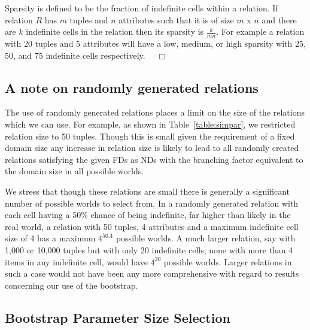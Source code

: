 \begin{definition}[Sparsity]\label{def:spar}
\begin{rm}
Sparsity is defined to be the fraction of indefinite cells within a 
relation. If relation $R$ has $m$ tuples and $n$ attributes such that it
is of size $m$ x $n$ and there are $k$ indefinite cells in the relation then
its sparsity is $\frac{k}{mn}$. For example a relation with 20 tuples
and 5 attributes will have a low, medium, or high sparsity with 
25, 50, and 75 indefinite cells respectively. $\quad\Box$
\end{rm}
\end{definition}

 

\subsection{A note on randomly generated relations}

The use of randomly generated relations places a limit on the size of
the relations which we can use. For example, as shown in
Table~\ref{table:simpar}, we restricted relation size to 50
tuples. Though this is small given the requirement of a fixed domain
size any increase in relation size is likely to lead to all randomly
created relations satisfying the given FDs as NDs with the branching
factor equivalent to the domain size in all possible worlds. 

\medskip

We stress that though these relations are small there is generally a
significant number of possible worlds to select from.  In a randomly
generated relation with each cell having a 50\% chance of being
indefinite, far higher than likely in the real world, a relation with
50 tuples, 4 attributes and a maximum indefinite cell size of 4 has a
maximum $4^{50.4}$ possible worlds.  A much larger relation, say with
1,000 or 10,000 tuples but with only 20 indefinite cells, none with more
than 4 items in any indefinite cell, would have $4^{20}$ possible
worlds. Larger relations in such a case would not have been any more
comprehensive with regard to results concerning our use of the
bootstrap. 

\subsection{Bootstrap Parameter Size Selection}

